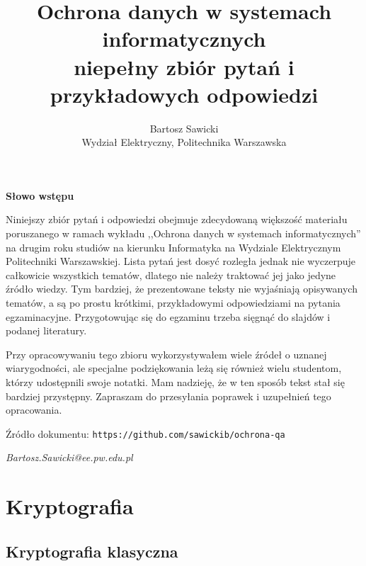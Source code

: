 \documentclass[answers,11pt]{exam}
\title{Ochrona danych w systemach informatycznych \\ \vspace{0.5cm} \large{niepełny zbiór pytań i przykładowych odpowiedzi}}
\author{Bartosz Sawicki \\ \small{Wydział Elektryczny, Politechnika Warszawska}}
\begin{document}
\maketitle

\noindent\textbf{Słowo wstępu}

Niniejszy zbiór pytań i odpowiedzi obejmuje zdecydowaną większość materiału poruszanego w ramach wykładu ,,Ochrona danych w systemach informatycznych'' na drugim roku studiów na kierunku Informatyka na Wydziale Elektrycznym Politechniki Warszawskiej. Lista pytań jest dosyć rozległa jednak nie wyczerpuje całkowicie wszystkich tematów, dlatego nie należy traktować jej jako jedyne źródło wiedzy. Tym bardziej, że prezentowane teksty nie wyjaśniają opisywanych tematów, a są po prostu krótkimi, przykładowymi odpowiedziami na pytania egzaminacyjne. Przygotowując się do egzaminu trzeba sięgnąć do slajdów i podanej literatury.

Przy opracowywaniu tego zbioru wykorzystywałem wiele źródeł o uznanej wiarygodności, ale specjalne podziękowania leżą się również wielu studentom, którzy udostępnili swoje notatki. Mam nadzieję, że w ten sposób tekst stał się bardziej przystępny. Zapraszam do przesyłania poprawek i uzupełnień tego opracowania.

Źródło dokumentu: \verb+https://github.com/sawickib/ochrona-qa+

\vspace{0.5cm}\hspace*{10cm}\textit{Bartosz.Sawicki@ee.pw.edu.pl}

\tableofcontents

\section{Kryptografia}

\subsection{Kryptografia klasyczna}
\end{document}
